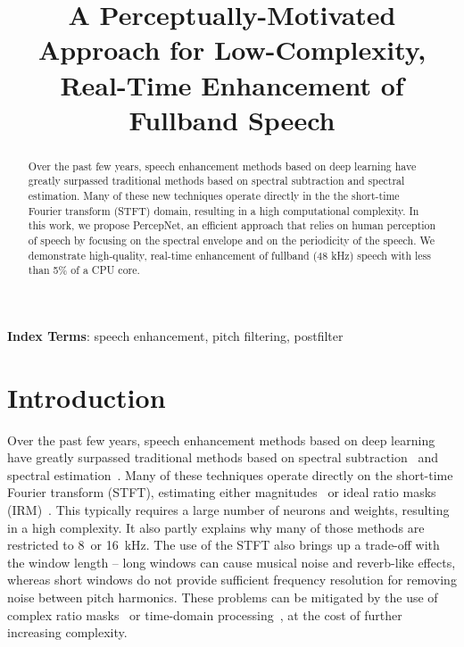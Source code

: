 \documentclass[english]{article}
\begin{document}
\address{Amazon Web Services}


\title{A Perceptually-Motivated Approach for Low-Complexity, Real-Time Enhancement
of Fullband Speech}
\maketitle
\begin{abstract}
Over the past few years, speech enhancement methods based on deep
learning have greatly surpassed traditional methods based on spectral
subtraction and spectral estimation. Many of these new techniques
operate directly in the the short-time Fourier transform (STFT) domain,
resulting in a high computational complexity. In this work, we propose
PercepNet, an efficient approach that relies on human perception of
speech by focusing on the spectral envelope and on the periodicity
of the speech. We demonstrate high-quality, real-time enhancement
of fullband (48 kHz) speech with less than 5\% of a CPU core.
\end{abstract}
\noindent\textbf{Index Terms}: speech enhancement, pitch filtering, postfilter


\section{Introduction}

Over the past few years, speech enhancement methods based on deep
learning have greatly surpassed traditional methods based on spectral
subtraction~\cite{boll1979suppression} and spectral estimation~\cite{ephraim1985speech}.
Many of these techniques operate directly on the short-time Fourier
transform (STFT), estimating either magnitudes~\cite{liu2014experiments,xu2015regression,tan2018convolutional}
or ideal ratio masks (IRM)~\cite{narayanan2013ideal,zhao2016dnn}.
This typically requires a large number of neurons and weights, resulting
in a high complexity. It also partly explains why many of those methods
are restricted to 8~or 16~kHz. The use of the STFT also brings up
a trade-off with the window length -- long windows can cause musical
noise and reverb-like effects, whereas short windows do not provide
sufficient frequency resolution for removing noise between pitch harmonics.
These problems can be mitigated by the use of complex ratio masks~\cite{williamson2015complex}
or time-domain processing~\cite{pascual2017segan,rethage2018wavenet,macartney2018improved},
at the cost of further increasing complexity.
\end{document}
